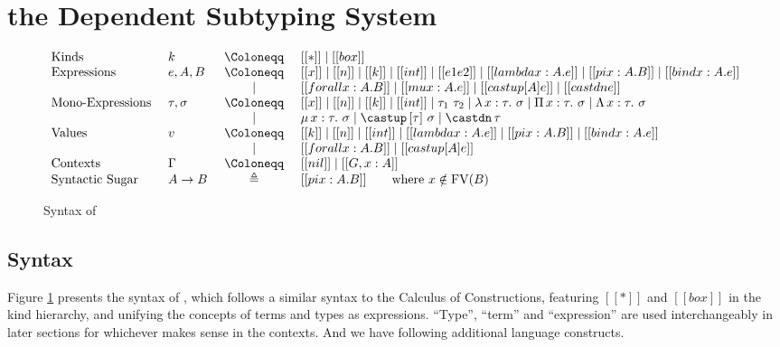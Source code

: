 \section{the Dependent Subtyping System}

\begin{figure}
\centering
\begin{equation*}
\begin{array}{llcl}
    \text{Kinds} & k & ~\Coloneqq ~ & [[*]] \mid [[box]] \\
    \text{Expressions} & e, A, B & ~ \Coloneqq ~ & [[x]] \mid [[n]] \mid [[k]] \mid [[int]] \mid [[e1 e2]] \mid [[lambda x : A. e]]
        \mid [[pi x : A. B]] \mid [[bind x : A. e]] \\
        & & \mid & [[forall x : A. B]] \mid [[mu x : A. e]] \mid [[castup [A] e]] \mid [[castdn e]]   \\
    \text{Mono-Expressions} ~ & \tau, \sigma & ~ \Coloneqq ~ & [[x]] \mid [[n]] \mid [[k]] \mid [[int]] \mid \tau_1 ~ \tau_2 \mid \lambda \, x : \tau. ~ \sigma \mid \Pi \, x : \tau. ~ \sigma \mid \Lambda \, x : \tau. ~ \sigma \\
        & & \mid & \mu \, x : \tau. ~ \sigma \mid \castup \, [\tau]~ \sigma \mid \castdn \, \tau \\
    \text{Values} & v & ~ \Coloneqq ~ & [[k]] \mid [[n]] \mid [[int]] \mid [[lambda x : A. e]] \mid [[pi x : A. B]] \mid [[bind x : A. e]] \\
        & & \mid & [[forall x : A. B]] \mid [[castup [A] e]] \\
    \text{Contexts} & \Gamma & ~ \Coloneqq ~ & [[nil]] \mid [[G , x : A]] \\
    \text{Syntactic Sugar} ~ & A \rightarrow B & \triangleq & [[pi x : A. B]] \qquad \text{where} ~ x \notin \mathrm{FV}(B)
\end{array}
\end{equation*}
\caption{Syntax of \system}
\label{fig:syntax}
\end{figure}

\subsection{Syntax}

Figure \ref{fig:syntax} presents the syntax of \system, which follows a similar
syntax to the Calculus of Constructions\cite{CoquandThierry1988Tcoc}, featuring
$[[*]]$ and $[[box]]$ in the kind hierarchy, and unifying the concepts of terms
and types as expressions. ``Type'', ``term'' and ``expression'' are used
interchangeably in later sections for whichever makes sense in the contexts.
And we have following additional language constructs.

